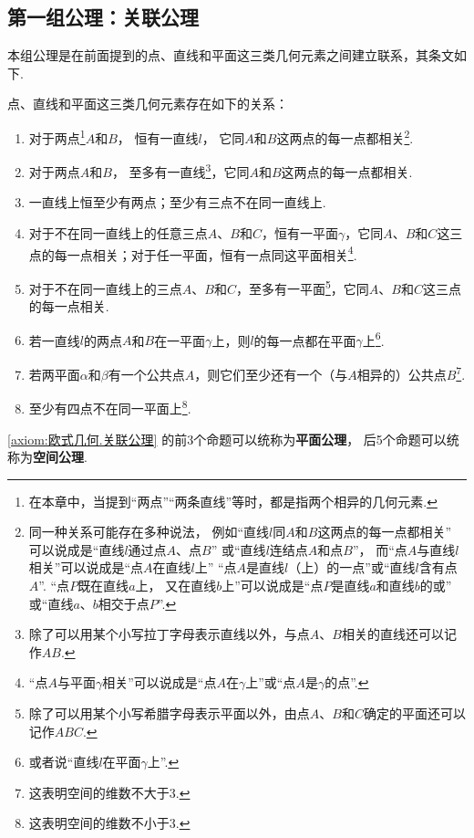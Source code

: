 \subsection{第一组公理：关联公理}
本组公理是在前面提到的点、直线和平面这三类几何元素之间建立联系，其条文如下.
\begin{axiom}[关联公理]\label{axiom:欧式几何.关联公理}
点、直线和平面这三类几何元素存在如下的关系：
\begin{enumerate}
\item 对于两点\footnote{%
在本章中，当提到“两点”“两条直线”等时，都是指两个相异的几何元素.%
}\(A\)和\(B\)，%
恒有一直线\(l\)，%
它同\(A\)和\(B\)这两点的每一点都相关\footnote{%
同一种关系可能存在多种说法，%
例如“直线\(l\)同\(A\)和\(B\)这两点的每一点都相关”
可以说成是“直线\(l\)通过点\(A\)、点\(B\)”
或“直线\(l\)连结点\(A\)和点\(B\)”，%
而“点\(A\)与直线\(l\)相关”可以说成是“点\(A\)在直线\(l\)上”
“点\(A\)是直线\(l\)（上）的一点”或“直线\(l\)含有点\(A\)”.%
“点\(P\)既在直线\(a\)上，%
又在直线\(b\)上”可以说成是“点\(P\)是直线\(a\)和直线\(b\)的或”
或“直线\(a\)、\(b\)相交于点\(P\)”.
}.

\item 对于两点\(A\)和\(B\)，%
至多有一直线\footnote{%
除了可以用某个小写拉丁字母表示直线以外，与点\(A\)、\(B\)相关的直线还可以记作\(AB\).%
}，它同\(A\)和\(B\)这两点的每一点都相关.

\item 一直线上恒至少有两点；至少有三点不在同一直线上.

\item 对于不在同一直线上的任意三点\(A\)、\(B\)和\(C\)，恒有一平面\(\gamma\)，它同\(A\)、\(B\)和\(C\)这三点的每一点相关；对于任一平面，恒有一点同这平面相关\footnote{%
“点\(A\)与平面\(\gamma\)相关”可以说成是“点\(A\)在\(\gamma\)上”或“点\(A\)是\(\gamma\)的点”.%
}.

\item 对于不在同一直线上的三点\(A\)、\(B\)和\(C\)，至多有一平面\footnote{%
除了可以用某个小写希腊字母表示平面以外，由点\(A\)、\(B\)和\(C\)确定的平面还可以记作\(ABC\).%
}，它同\(A\)、\(B\)和\(C\)这三点的每一点相关.

\item 若一直线\(l\)的两点\(A\)和\(B\)在一平面\(\gamma\)上，则\(l\)的每一点都在平面\(\gamma\)上\footnote{%
或者说“直线\(l\)在平面\(\gamma\)上”.%
}.

\item 若两平面\(\alpha\)和\(\beta\)有一个公共点\(A\)，则它们至少还有一个（与\(A\)相异的）公共点\(B\)\footnote{%
这表明空间的维数不大于3.%
}.

\item 至少有四点不在同一平面上\footnote{%
这表明空间的维数不小于3.%
}.
\end{enumerate}
\end{axiom}
\cref{axiom:欧式几何.关联公理}
的前3个命题可以统称为{\bf 平面公理}，
后5个命题可以统称为{\bf 空间公理}.

